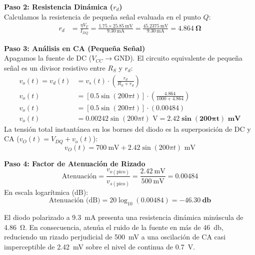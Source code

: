\documentclass[11pt, a4paper]{article}
\begin{document}
\noindent\textbf{Paso 2: Resistencia Dinámica ($r_d$)}\\
Calculamos la resistencia de pequeña señal evaluada en el punto $Q$:
\begin{align*}
    r_d &= \frac{\eta V_T}{I_{DQ}} = \frac{1.75 \times \qty{25.85}{\milli\volt}}{\qty{9.30}{\milli\ampere}} = \frac{\qty{45.2375}{\milli\volt}}{\qty{9.30}{\milli\ampere}} = \mathbf{\qty{4.864}{\ohm}}
\end{align*}

\noindent\textbf{Paso 3: Análisis en CA (Pequeña Señal)}\\
Apagamos la fuente de DC ($V_{CC} \to \text{GND}$). El circuito equivalente de pequeña señal es un divisor resistivo entre $R_S$ y $r_d$:
\begin{align*}
    v_o(t) = v_d(t) &= v_s(t) \cdot \left( \frac{r_d}{R_S + r_d} \right) \\
    v_o(t) &= [0.5 \sin(200\pi t)] \cdot \left( \frac{4.864}{1000 + 4.864} \right) \\
    v_o(t) &= [0.5 \sin(200\pi t)] \cdot (0.00484) \\
    v_o(t) &= 0.00242 \sin(200\pi t)\text{ V} = \mathbf{2.42 \sin(200\pi t)\text{ mV}}
\end{align*}
La tensión total instantánea en los bornes del diodo es la superposición de DC y CA ($v_O(t) = V_{DQ} + v_o(t)$):
\begin{equation*}
    v_O(t) = \qty{700}{\milli\volt} + 2.42 \sin(200\pi t)\text{ mV}
\end{equation*}

\noindent\textbf{Paso 4: Factor de Atenuación de Rizado}\\
\begin{equation*}
    \text{Atenuación} = \frac{v_{o(\text{pico})}}{v_{s(\text{pico})}} = \frac{\qty{2.42}{\milli\volt}}{\qty{500}{\milli\volt}} = 0.00484
\end{equation*}
En escala logarítmica (dB):
\begin{equation*}
    \text{Atenuación (dB)} = 20 \log_{10}(0.00484) = \mathbf{\qty{-46.30}{\decibel}}
\end{equation*}

\begin{interpretacion}
    El diodo polarizado a \qty{9.3}{\milli\ampere} presenta una resistencia dinámica minúscula de \qty{4.86}{\ohm}. En consecuencia, atenúa el ruido de la fuente en más de \qty{46}{\decibel}, reduciendo un rizado perjudicial de \qty{500}{\milli\volt} a una oscilación de CA casi imperceptible de \qty{2.42}{\milli\volt} sobre el nivel de continua de \qty{0.7}{\volt}.
\end{interpretacion}
\end{document}
